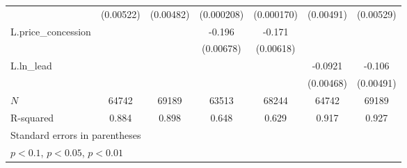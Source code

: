 {\begin{tabular}{l*{6}{c}}
            &   (0.00522)         &   (0.00482)         &  (0.000208)         &  (0.000170)         &   (0.00491)         &   (0.00529)         \\
\addlinespace
L.price\_concession&                     &                     &      -0.196\sym{***}&      -0.171\sym{***}&                     &                     \\
            &                     &                     &   (0.00678)         &   (0.00618)         &                     &                     \\
\addlinespace
L.ln\_lead   &                     &                     &                     &                     &     -0.0921\sym{***}&      -0.106\sym{***}\\
            &                     &                     &                     &                     &   (0.00468)         &   (0.00491)         \\
\midrule
\(N\)       &       64742         &       69189         &       63513         &       68244         &       64742         &       69189         \\
R-squared   &       0.884         &       0.898         &       0.648         &       0.629         &       0.917         &       0.927         \\
\bottomrule
\multicolumn{7}{l}{\footnotesize Standard errors in parentheses}\\
\multicolumn{7}{l}{\footnotesize \sym{*} \(p<0.1\), \sym{**} \(p<0.05\), \sym{***} \(p<0.01\)}\\
\end{tabular}
}
